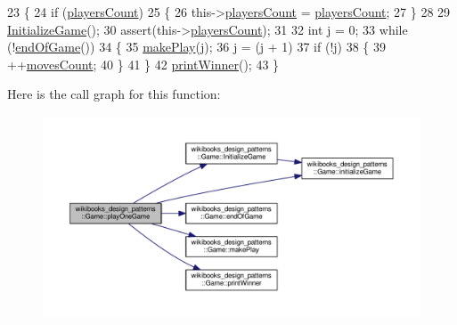 \begin{DoxyCode}
23     \{
24         \textcolor{keywordflow}{if} (\hyperlink{classwikibooks__design__patterns_1_1Game_a8641adb02e0f068ff9ecb6c375562d7b}{playersCount})
25         \{
26             this->\hyperlink{classwikibooks__design__patterns_1_1Game_a8641adb02e0f068ff9ecb6c375562d7b}{playersCount} = \hyperlink{classwikibooks__design__patterns_1_1Game_a8641adb02e0f068ff9ecb6c375562d7b}{playersCount};
27         \}
28 
29         \hyperlink{classwikibooks__design__patterns_1_1Game_a3de3408a468266ea25ba26b8e27544e3}{InitializeGame}();
30         assert(this->\hyperlink{classwikibooks__design__patterns_1_1Game_a8641adb02e0f068ff9ecb6c375562d7b}{playersCount});
31 
32         \textcolor{keywordtype}{int} j = 0;
33         \textcolor{keywordflow}{while} (!\hyperlink{classwikibooks__design__patterns_1_1Game_a351f5fb200c6b26d5b6150f1f09bc87d}{endOfGame}())
34         \{
35             \hyperlink{classwikibooks__design__patterns_1_1Game_ab1859f681536780d02da57634e963d4a}{makePlay}(j);
36             j = (j + 1) %
37             \textcolor{keywordflow}{if} (!j)
38             \{
39                 ++\hyperlink{classwikibooks__design__patterns_1_1Game_ac7bac015fe2e5ead905f7fb8ae63d3aa}{movesCount};
40             \}
41         \}
42         \hyperlink{classwikibooks__design__patterns_1_1Game_a98d860c143cb793b4c1cb630d9314cba}{printWinner}();
43     \}
\end{DoxyCode}


Here is the call graph for this function\+:
\nopagebreak
\begin{figure}[H]
\begin{center}
\leavevmode
\includegraphics[width=350pt]{classwikibooks__design__patterns_1_1Game_adaf21d3c4d07388f1cba12092ced5d38_cgraph}
\end{center}
\end{figure}


